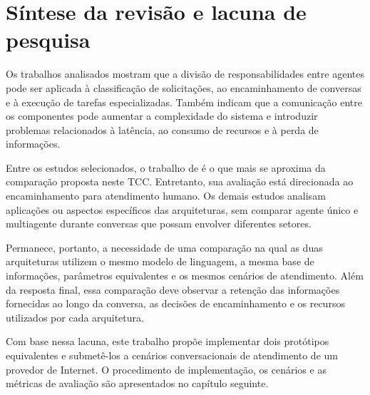 \section{Síntese da revisão e lacuna de pesquisa}
\label{sec:sintese-revisao}

Os trabalhos analisados mostram que a divisão de responsabilidades entre agentes pode ser aplicada à classificação de solicitações, ao encaminhamento de conversas e à execução de tarefas especializadas. Também indicam que a comunicação entre os componentes pode aumentar a complexidade do sistema e introduzir problemas relacionados à latência, ao consumo de recursos e à perda de informações.

Entre os estudos selecionados, o trabalho de \textcite{amri2026} é o que mais se aproxima da comparação proposta neste TCC. Entretanto, sua avaliação está direcionada ao encaminhamento para atendimento humano. Os demais estudos analisam aplicações ou aspectos específicos das arquiteturas, sem comparar agente único e multiagente durante conversas que possam envolver diferentes setores.

Permanece, portanto, a necessidade de uma comparação na qual as duas arquiteturas utilizem o mesmo modelo de linguagem, a mesma base de informações, parâmetros equivalentes e os mesmos cenários de atendimento. Além da resposta final, essa comparação deve observar a retenção das informações fornecidas ao longo da conversa, as decisões de encaminhamento e os recursos utilizados por cada arquitetura.

Com base nessa lacuna, este trabalho propõe implementar dois protótipos equivalentes e submetê-los a cenários conversacionais de atendimento de um provedor de Internet. O procedimento de implementação, os cenários e as métricas de avaliação são apresentados no capítulo seguinte.
